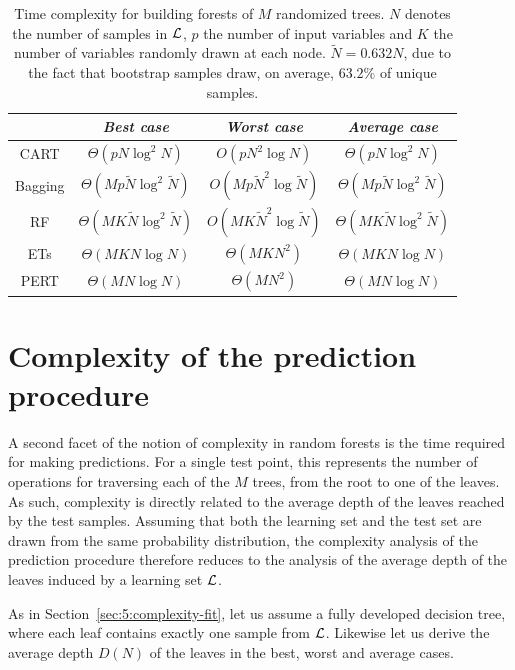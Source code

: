 \begin{table}
    \centering
    \begin{tabular}{| c | c c c |}
    \hline
         & \textit{Best case} & \textit{Worst case} & \textit{Average case}  \\
    \hline
    \hline
    CART & $\Theta(pN\log^2 N)$ & $O(pN^2\log N)$ & $\Theta(pN\log^2 N)$ \\
    Bagging & $\Theta(Mp\widetilde{N}\log^2 \widetilde{N})$ & $O(Mp\widetilde{N}^2\log \widetilde{N})$ & $\Theta(Mp\widetilde{N}\log^2 \widetilde{N})$  \\
    RF & $\Theta(MK\widetilde{N}\log^2 \widetilde{N})$ & $O(MK\widetilde{N}^2\log \widetilde{N})$ & $\Theta(MK\widetilde{N}\log^2 \widetilde{N})$  \\
    ETs & $\Theta(MKN\log N)$ & $\Theta(MKN^2)$ & $\Theta(MKN\log N)$  \\
    PERT & $\Theta(MN\log N)$ & $\Theta(MN^2)$ & $\Theta(MN\log N)$  \\
    \hline
    \end{tabular}
    \caption{Time complexity for building forests of $M$ randomized trees. $N$ denotes the number of samples in ${\cal L}$, $p$ the number of input variables and $K$ the number of variables randomly drawn at each node. $\widetilde{N} = 0.632 N$, due to the fact that bootstrap samples draw, on average, $63.2\%$ of unique samples.}
    \label{table:complexity-fit}
\end{table}

\section{Complexity of the prediction procedure}
\label{sec:5:complexity-predict}

A second facet of the notion of complexity in random forests is the time
required for making predictions. For a single test point, this represents the
number of operations for traversing each of the $M$ trees, from the root to one
of the leaves. As such, complexity is directly related to the average depth of
the leaves reached by the test samples. Assuming that both the learning set and
the test set are drawn from the same probability distribution, the complexity
analysis of the prediction procedure therefore reduces to the analysis of the
average depth of the leaves induced by a learning set ${\cal L}$.

As in Section~\ref{sec:5:complexity-fit}, let us assume a fully developed
decision tree, where each leaf contains exactly one sample from ${\cal L}$. Likewise
let us derive the average depth $D(N)$ of the leaves in the best,
worst and average cases.

